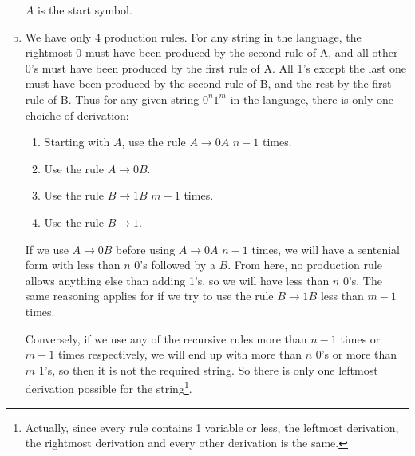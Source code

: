 \documentclass{article}
\begin{document}
\begin{enumerate}[(a)]
        $A$ is the start symbol.

    \item
        We have only 4 production rules. For any string in the language, the rightmost 0 must have been produced by the second rule of A, and all other 0's must have been produced by the first rule of A. All 1's except the last one must have been produced by the second rule of B, and the rest by the first rule of B. Thus for any given string $0^n1^m$ in the language, there is only one choiche of derivation:
        \begin{enumerate}[(1)]
            \item Starting with $A$, use the rule $A \to 0A$ $n-1$ times.
            \item Use the rule $A \to 0B$.
            \item Use the rule $B \to 1B$ $m-1$ times.
            \item Use the rule $B \to 1$.
        \end{enumerate}

        If we use $A \to 0B$ before using $A \to 0A$ $n-1$ times, we will have a sentenial form with less than $n$ 0's followed by a $B$. From here, no production rule allows anything else than adding 1's, so we will have less than $n$ 0's. The same reasoning applies for if we try to use the rule $B \to 1B$ less than $m-1$ times. 
        
        Conversely, if we use any of the recursive rules more than $n-1$ times or $m-1$ times respectively, we will end up with more than $n$ 0's or more than $m$ 1's, so then it is not the required string. So there is only one leftmost derivation possible for the string\footnote{Actually, since every rule contains 1 variable or less, the leftmost derivation, the rightmost derivation and every other derivation is the same.}.
\end{enumerate}
\end{document}

